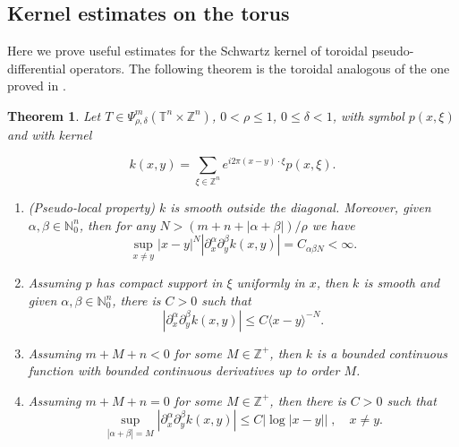 \documentclass[12pt, reqno]{amsart}
\newtheorem{theorem}{Theorem}[section]
\theoremstyle{definition}
\theoremstyle{remark}
\numberwithin{equation}{section}
\begin{document}
\subsection{Kernel estimates on the torus}
\label{section:kernel-estimates}
Here we prove useful estimates for the Schwartz kernel of toroidal pseudo-differential operators. The following theorem is the toroidal analogous of the one proved in \cite[Theorem~1.1]{alvarez-hounie}.
\begin{theorem}
    Let $T \in \Psi^m_{\rho, \delta}(\mathbb{T}^n \times \mathbb{Z}^n) $, $0 < \rho \leq 1$, $0 \leq \delta < 1$, with symbol $p(x, \xi)$ and with kernel

    \begin{equation}
        k(x, y) = \sum_{\xi \in \mathbb{Z}^n} e^{i2\pi(x - y) \cdot \xi} p(x, \xi).
    \end{equation}
    \begin{enumerate}
        \item[(a)] (Pseudo-local property) $k$ is smooth outside the diagonal. Moreover, given $\alpha, \beta \in \mathbb{N}^n_0$, then for any $N > (m + n + |\alpha + \beta|)/\rho$ we have
        \begin{equation}
            \sup_{x \neq y} |x - y|^N |\partial^\alpha_x \partial^\beta_y k(x, y)| = C_{\alpha\beta N} < \infty.
            \label{eq:teo3-1a}
        \end{equation}

        \item[(b)] Assuming  $p$ has compact support in $\xi$ uniformly in $x$, then $k$ is smooth and given $\alpha, \beta \in \mathbb{N}^n_0$, there is $C>0$ such that 
        \begin{equation}
            |\partial^\alpha_x \partial^\beta_y k(x, y)| \leq C\langle x - y \rangle^{-N}.
        \end{equation}


        \item[(c)] Assuming $m + M + n < 0$ for some $M \in \mathbb{Z}^+$, then $k$ is a bounded continuous function with bounded continuous derivatives up to order $M$.\\

        \item[(d)] Assuming $m + M + n = 0$ for some $M \in \mathbb{Z}^+$, then there is $ C >0$ such that 
        \begin{equation}
            \sup_{|\alpha + \beta| = M} |\partial^\alpha_x \partial^\beta_y k(x, y)| \leq C | \log |x-y| | \; , \quad x \neq y.
        \end{equation} 
    \end{enumerate}
\end{theorem}
\end{document}
